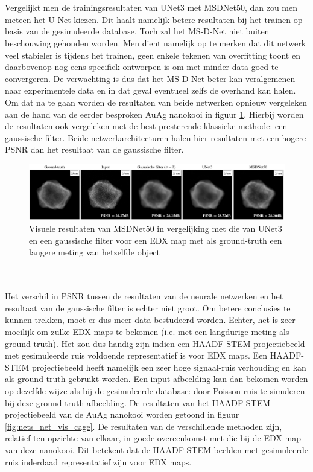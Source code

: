 \documentclass{report}
\begin{document}
\\ \\
Vergelijkt men de trainingsresultaten van UNet3 met MSDNet50, dan zou men meteen het U-Net kiezen. Dit haalt namelijk betere resultaten bij het trainen op basis van de gesimuleerde database. Toch zal het MS-D-Net niet buiten beschouwing gehouden worden. Men dient namelijk op te merken dat dit netwerk veel stabieler is tijdens het trainen, geen enkele tekenen van overfitting toont en daarbovenop nog eens specifiek ontworpen is om met minder data goed te convergeren. De verwachting is dus dat het MS-D-Net beter kan veralgemenen naar experimentele data en in dat geval eventueel zelfs de overhand kan halen. Om dat na te gaan worden de resultaten van beide netwerken opnieuw vergeleken aan de hand van de eerder besproken AuAg nanokooi in figuur \ref{fig:nets_net_vis_edx}. Hierbij worden de resultaten ook vergeleken met de best presterende klassieke methode: een gaussische filter. Beide netwerkarchitecturen halen hier resultaten met een hogere PSNR dan het resultaat van de gaussische filter.
\begin{figure}[h!]
	\centering
	\includegraphics[width=15cm]{images/nets/net_vis_edx.png}
	\caption{Visuele resultaten van MSDNet50 in vergelijking met die van UNet3 en een gaussische filter voor een EDX map met als ground-truth een langere meting van hetzelfde object}
	\label{fig:nets_net_vis_edx}
\end{figure}
\\ \\
Het verschil in PSNR tussen de resultaten van de neurale netwerken en het resultaat van de gaussische filter is echter niet groot. Om betere conclusies te kunnen trekken, moet er dus meer data bestudeerd worden. Echter, het is zeer moeilijk om zulke EDX maps te bekomen (i.e. met een langdurige meting als ground-truth). Het zou dus handig zijn indien een HAADF-STEM projectiebeeld met gesimuleerde ruis voldoende representatief is voor EDX maps. Een HAADF-STEM projectiebeeld heeft namelijk een zeer hoge signaal-ruis verhouding en kan als ground-truth gebruikt worden. Een input afbeelding kan dan bekomen worden op dezelfde wijze als bij de gesimuleerde database: door Poisson ruis te simuleren bij deze ground-truth afbeelding. De resultaten van het HAADF-STEM projectiebeeld van de AuAg nanokooi worden getoond in figuur \ref{fig:nets_net_vis_cage}. De resultaten van de verschillende methoden zijn, relatief ten opzichte van elkaar, in goede overeenkomst met die bij de EDX map van deze nanokooi. Dit betekent dat de HAADF-STEM beelden met gesimuleerde ruis inderdaad representatief zijn voor EDX maps.
\end{document}
